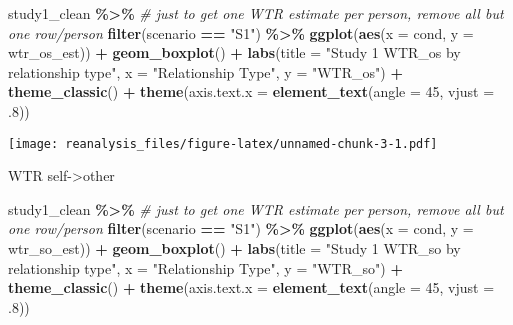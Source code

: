 \documentclass[
]{article}
\newenvironment{Shaded}{\begin{snugshade}}{\end{snugshade}}
\newcommand{\AttributeTok}[1]{\textcolor[rgb]{0.13,0.29,0.53}{#1}}
\newcommand{\CommentTok}[1]{\textcolor[rgb]{0.56,0.35,0.01}{\textit{#1}}}
\newcommand{\DecValTok}[1]{\textcolor[rgb]{0.00,0.00,0.81}{#1}}
\newcommand{\FunctionTok}[1]{\textcolor[rgb]{0.13,0.29,0.53}{\textbf{#1}}}
\newcommand{\NormalTok}[1]{#1}
\newcommand{\SpecialCharTok}[1]{\textcolor[rgb]{0.81,0.36,0.00}{\textbf{#1}}}
\newcommand{\StringTok}[1]{\textcolor[rgb]{0.31,0.60,0.02}{#1}}
\begin{document}
\begin{Shaded}
\begin{Highlighting}[]
\NormalTok{study1\_clean }\SpecialCharTok{\%\textgreater{}\%}
  \CommentTok{\# just to get one WTR estimate per person, remove all but one row/person}
  \FunctionTok{filter}\NormalTok{(scenario }\SpecialCharTok{==} \StringTok{"S1"}\NormalTok{) }\SpecialCharTok{\%\textgreater{}\%} 
  \FunctionTok{ggplot}\NormalTok{(}\FunctionTok{aes}\NormalTok{(}\AttributeTok{x =}\NormalTok{ cond, }\AttributeTok{y =}\NormalTok{ wtr\_os\_est)) }\SpecialCharTok{+}
  \FunctionTok{geom\_boxplot}\NormalTok{() }\SpecialCharTok{+}
  \FunctionTok{labs}\NormalTok{(}\AttributeTok{title =} \StringTok{"Study 1 WTR\_os by relationship type"}\NormalTok{, }\AttributeTok{x =} \StringTok{"Relationship Type"}\NormalTok{, }\AttributeTok{y =} \StringTok{"WTR\_os"}\NormalTok{) }\SpecialCharTok{+}
  \FunctionTok{theme\_classic}\NormalTok{() }\SpecialCharTok{+}
  \FunctionTok{theme}\NormalTok{(}\AttributeTok{axis.text.x =} \FunctionTok{element\_text}\NormalTok{(}\AttributeTok{angle =} \DecValTok{45}\NormalTok{, }\AttributeTok{vjust =}\NormalTok{ .}\DecValTok{8}\NormalTok{))}
\end{Highlighting}
\end{Shaded}

\texttt{[image: reanalysis\_files/figure-latex/unnamed-chunk-3-1.pdf]}

WTR self-\textgreater other

\begin{Shaded}
\begin{Highlighting}[]
\NormalTok{study1\_clean }\SpecialCharTok{\%\textgreater{}\%}
  \CommentTok{\# just to get one WTR estimate per person, remove all but one row/person}
  \FunctionTok{filter}\NormalTok{(scenario }\SpecialCharTok{==} \StringTok{"S1"}\NormalTok{) }\SpecialCharTok{\%\textgreater{}\%} 
  \FunctionTok{ggplot}\NormalTok{(}\FunctionTok{aes}\NormalTok{(}\AttributeTok{x =}\NormalTok{ cond, }\AttributeTok{y =}\NormalTok{ wtr\_so\_est)) }\SpecialCharTok{+}
  \FunctionTok{geom\_boxplot}\NormalTok{() }\SpecialCharTok{+}
  \FunctionTok{labs}\NormalTok{(}\AttributeTok{title =} \StringTok{"Study 1 WTR\_so by relationship type"}\NormalTok{, }\AttributeTok{x =} \StringTok{"Relationship Type"}\NormalTok{, }\AttributeTok{y =} \StringTok{"WTR\_so"}\NormalTok{) }\SpecialCharTok{+}
  \FunctionTok{theme\_classic}\NormalTok{() }\SpecialCharTok{+}
  \FunctionTok{theme}\NormalTok{(}\AttributeTok{axis.text.x =} \FunctionTok{element\_text}\NormalTok{(}\AttributeTok{angle =} \DecValTok{45}\NormalTok{, }\AttributeTok{vjust =}\NormalTok{ .}\DecValTok{8}\NormalTok{))}
\end{Highlighting}
\end{Shaded}
\end{document}
